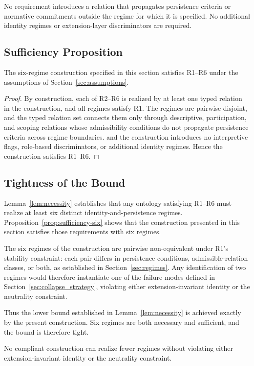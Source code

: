 No requirement introduces a relation that propagates
persistence criteria or normative commitments
outside the regime for which it is specified.
No additional identity regimes or extension-layer
discriminators are required.

\subsection{Sufficiency Proposition}

\begin{proposition}
\label{prop:sufficiency-six}
The six-regime construction specified in this section
satisfies R1--R6 under the assumptions of
Section~\ref{sec:assumptions}.
\end{proposition}

\begin{proof}
By construction, each of R2--R6 is realized
by at least one typed relation
in the construction,
and all regimes satisfy R1.
The regimes are pairwise disjoint,
and the typed relation set connects them
only through descriptive, participation, and scoping relations
whose admissibility conditions
do not propagate persistence criteria across regime boundaries.
and the construction introduces no interpretive flags,
role-based discriminators, or additional identity regimes.
Hence the construction satisfies R1--R6.
\end{proof}

\subsection{Tightness of the Bound}

Lemma~\ref{lem:necessity} establishes that any ontology satisfying R1--R6
must realize at least six distinct identity-and-persistence regimes.
Proposition~\ref{prop:sufficiency-six} shows that the construction
presented in this section satisfies those requirements with six regimes.

The six regimes of the construction are pairwise non-equivalent
under R1's stability constraint:
each pair differs in persistence conditions,
admissible-relation classes,
or both,
as established in Section~\ref{sec:regimes}.
Any identification of two regimes would therefore instantiate one of
the failure modes defined in Section~\ref{sec:collapse_strategy},
violating either extension-invariant identity or the neutrality constraint.

Thus the lower bound established in Lemma~\ref{lem:necessity}
is achieved exactly by the present construction.
Six regimes are both necessary and sufficient,
and the bound is therefore tight.

No compliant construction can realize fewer regimes
without violating either extension-invariant identity
or the neutrality constraint.
